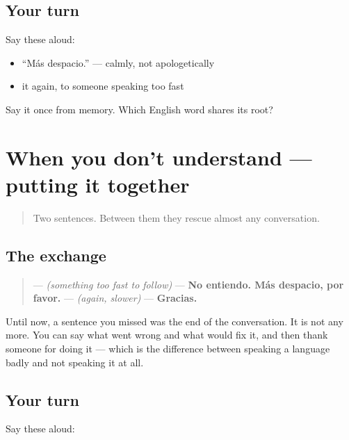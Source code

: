 \subsection*{Your turn}
Say these aloud:

\begin{itemize}
\raggedright
  \item \textquotedblleft{}Más despacio.\textquotedblright{} — calmly, not apologetically
  \item it again, to someone speaking too fast
\end{itemize}

\begin{tcolorbox}[breakable,colback=teal!4,colframe=teal!35!black,title={Before you move on}]
Say it once from memory. Which English word shares its root?
\end{tcolorbox}
\section[Practice]{When you don't understand — putting it together}

\label{lesson:ES-R03-repaso-reparar}



\begin{quote}
Two sentences. Between them they rescue almost any conversation.
\end{quote}

\subsection*{The exchange}
\begin{quote}
— \emph{(something too fast to follow)} — \textbf{No entiendo. Más despacio, por favor.} — \emph{(again, slower)} — \textbf{Gracias.}
\end{quote}

\begin{grammarlens}[title={What you've built}]
Until now, a sentence you missed was the end of the conversation. It is not any more. You can say what went wrong and what would fix it, and then thank someone for doing it — which is the difference between speaking a language badly and not speaking it at all.
\end{grammarlens}

\subsection*{Your turn}
Say these aloud:

